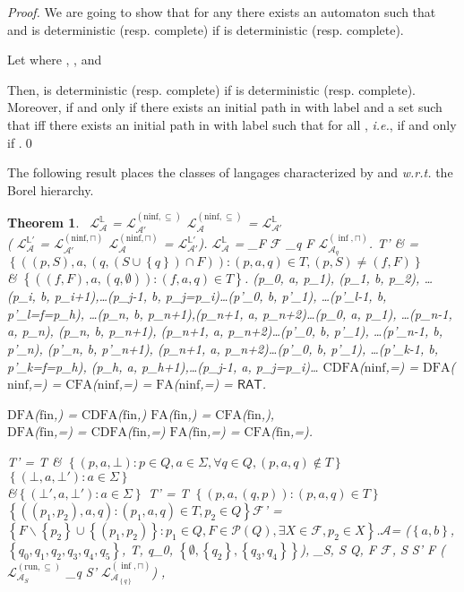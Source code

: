 \documentclass[preprint]{elsarticle}
\makeatletter
\newcommand{\A}{\ensuremath{\mathcal{A}}\xspace}
\newcommand{\powerset}[1]{\ensuremath{\mathcal{P}\left( #1 \right)}\xspace}
\newcommand{\calF}{\ensuremath{\mathcal{F}}\xspace}
\newcommand{\set}[1]{\ensuremath{\left\{ #1  \right\}}\xspace}
\newcommand{\Lcond}[2]{\ensuremath{\mathcal{L}^{#1}_{ #2}}\xspace}
\newcommand{\ie}{\emph{i.e.}\@\xspace}
\newcommand{\wrt}{\emph{w.r.t.}\@\xspace}
\newcommand{\FA}{\ensuremath{\mathrm{FA}}\xspace}
\newcommand{\CFA}{\ensuremath{\mathrm{CFA}}\xspace}
\newcommand{\DFA}{\ensuremath{\mathrm{DFA}}\xspace}
\newcommand{\CDFA}{\ensuremath{\mathrm{CDFA}}\xspace}
\newcommand{\run}{\ensuremath{\mathrm{run}}}
\newcommand{\fin}{\ensuremath{\mathrm{fin}}}
\newcommand{\ninf}{\ensuremath{\mathrm{ninf}}}
\newcommand{\RAT}{\ensuremath{\mathsf{RAT}}\xspace}
\newtheorem{theorem}{Theorem}[section]
\makeatother
\begin{document}
\begin{proof}
We are going to show that for any   there exists an automaton   such that  and  is deterministic (resp. complete) if  is deterministic (resp. complete). 

Let  where , , and 


Then,  is deterministic (resp. complete) if  is deterministic (resp. complete).
Moreover, 
 if and only if there exists an initial path  in  with label  and a set  such that  iff there exists an initial path  in  with label  such that  for all , \ie, if and only if .\qed
\end{proof}

The following result places the classes of langages characterized by  and 
\wrt the Borel hierarchy.

\begin{theorem}\mbox{\phantom{Q}}\ 
\Lcond{\mathbb{L}}{\A} = \Lcond{(\ninf, \subseteq)}{\A'}  \Lcond{(\ninf, \subseteq)}{\A} = \Lcond{\mathbb{L}}{\A'} \\ ( \Lcond{\mathbb{L'}}{\A} = \Lcond{(\ninf, \sqcap)}{\A'}  \Lcond{(\ninf, \sqcap)}{\A} = \Lcond{\mathbb{L'}}{\A'})\enspace.
\Lcond{\mathbb{L}}{\A} = \bigcup_{F \in \calF} \bigcap_{q \in F} \Lcond{(\inf, \sqcap)}{\A_{q}}\enspace.
T' & = \set{((p,S),a,(q, (S \cup \set{q}) \cap F)) : (p, a , q) \in T, (p,S) \neq (f,F)} \\
 & \bigcup  \set{((f,F),a,(q,\emptyset)) : (f, a , q) \in T}\enspace.
(p_0, a, p_1), (p_1, b, p_2),  \ldots (p_i, b, p_{i+1}),\ldots  (p_{j-1}, b, p_j=p_{i})\ldots(p'_0, b, p'_1), \ldots (p'_{l-1}, b, p'_l=f=p_h),  \ldots (p_n, b, p_{n+1}),(p_{n+1}, a, p_{n+2})\ldots(p_0, a, p_1), \ldots (p_{n-1}, a, p_n),  (p_n, b, p_{n+1}),  (p_{n+1}, a, p_{n+2})\ldots(p'_0, b, p'_1), \ldots (p'_{n-1}, b, p'_n),  (p'_n, b, p'_{n+1}), (p_{n+1}, a, p_{n+2})\ldots(p'_0, b, p'_1), \ldots (p'_{k-1}, b, p'_k=f=p_h),  (p_{h}, a, p_{h+1}),\ldots (p_{j-1}, a, p_{j}=p_i)\ldots
\CDFA(\ninf,=) = \DFA(\ninf,=) = \CFA(\ninf,=) = \FA(\ninf,=) = \RAT\enspace.

\DFA(\fin,\subseteq) = \CDFA(\fin,\subseteq) \FA(\fin,\subseteq) = \CFA(\fin,\subseteq)\enspace,\\
\DFA(\fin,=) = \CDFA(\fin,=) \text{ and }\FA(\fin,=) = \CFA(\fin,=)\enspace.

T'  =  T & \cup \set{(p,a,\bot) : p \in Q, a \in \Sigma, \forall q \in Q, (p,a,q) \not\in T} \cup \set{(\bot, a, \bot') : a \in \Sigma}\\
&\cup \set{(\bot', a, \bot') : a \in \Sigma}
T' = T \cup \set{(p,a,(q,p)) : (p,a,q) \in T} \cup \set{((p_1, p_2), a, q) : (p_1,a,q) \in T, p_2 \in Q}\calF' = \set{F \smallsetminus \set{p_2} \cup \set{(p_1,p_2)} : p_1 \in Q, F \in \powerset{Q}, \exists X \in \calF, p_2 \in X}\enspace.\A = (\set{a,b}, \set{q_0, q_1,q_2,q_3,q_4,q_5}, T, q_0, \set{\emptyset, \set{q_2}, \set{q_3,q_4}})\enspace,
\bigcup_{S, S \subseteq Q, \exists F \in \calF, S \smallsetminus S' \subseteq F}
\left(\Lcond{(\run,\subseteq)}{\A_S} \cap \bigcap_{q \in S'} \Lcond{(\inf,\sqcap)}{\A_{\set{q}}}\right) \enspace,


\end{theorem}
\end{document}
